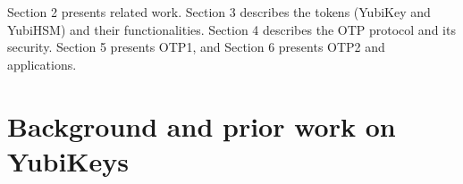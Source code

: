 Section 2 presents related work.
%
Section 3 describes the tokens (YubiKey and YubiHSM) and their functionalities.
%
Section 4 describes the OTP protocol and its security. Section 5 presents OTP1,
and Section 6 presents OTP2 and applications.



\section{Background and prior work on YubiKeys}

